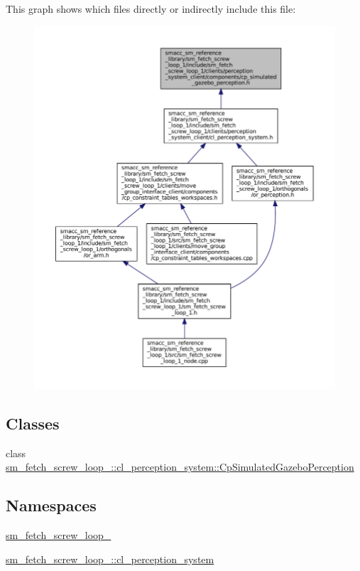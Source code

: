 This graph shows which files directly or indirectly include this file\+:
\nopagebreak
\begin{figure}[H]
\begin{center}
\leavevmode
\includegraphics[width=350pt]{sm__fetch__screw__loop__1_2include_2sm__fetch__screw__loop__1_2clients_2perception__system__cliebac11713cb2a94ca5f9f769d9d29762d}
\end{center}
\end{figure}
\subsection*{Classes}
\begin{DoxyCompactItemize}
\item 
class \hyperlink{classsm__fetch__screw__loop__1_1_1cl__perception__system_1_1CpSimulatedGazeboPerception}{sm\+\_\+fetch\+\_\+screw\+\_\+loop\+\_\+::cl\+\_\+perception\+\_\+system\+::\+Cp\+Simulated\+Gazebo\+Perception}
\end{DoxyCompactItemize}
\subsection*{Namespaces}
\begin{DoxyCompactItemize}
\item 
 \hyperlink{namespacesm__fetch__screw__loop__1}{sm\+\_\+fetch\+\_\+screw\+\_\+loop\+\_}
\item 
 \hyperlink{namespacesm__fetch__screw__loop__1_1_1cl__perception__system}{sm\+\_\+fetch\+\_\+screw\+\_\+loop\+\_\+::cl\+\_\+perception\+\_\+system}
\end{DoxyCompactItemize}
